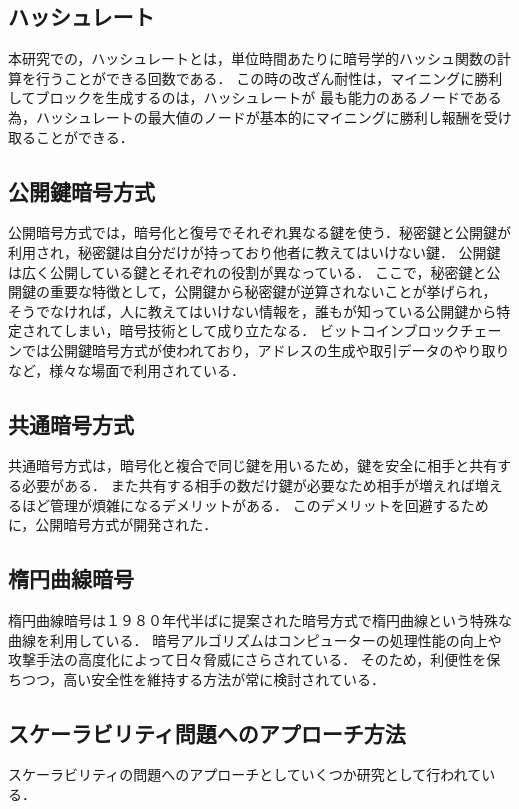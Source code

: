 \documentclass[a4paper,12pt]{jsarticle}
\begin{document}
      \subsection*{ハッシュレート}
本研究での，ハッシュレートとは，単位時間あたりに暗号学的ハッシュ関数の計算を行うことができる回数である．
この時の改ざん耐性は，マイニングに勝利してブロックを生成するのは，ハッシュレートが
最も能力のあるノードである為，ハッシュレートの最大値のノードが基本的にマイニングに勝利し報酬を受け取ることができる．

      \subsection*{公開鍵暗号方式}

公開暗号方式では，暗号化と復号でそれぞれ異なる鍵を使う．秘密鍵と公開鍵が利用され，秘密鍵は自分だけが持っており他者に教えてはいけない鍵．
公開鍵は広く公開している鍵とそれぞれの役割が異なっている．
ここで，秘密鍵と公開鍵の重要な特徴として，公開鍵から秘密鍵が逆算されないことが挙げられ，
そうでなければ，人に教えてはいけない情報を，誰もが知っている公開鍵から特定されてしまい，暗号技術として成り立たなる．
ビットコインブロックチェーンでは公開鍵暗号方式が使われており，アドレスの生成や取引データのやり取りなど，様々な場面で利用されている．

      \subsection*{共通暗号方式}
共通暗号方式は，暗号化と複合で同じ鍵を用いるため，鍵を安全に相手と共有する必要がある．
また共有する相手の数だけ鍵が必要なため相手が増えれば増えるほど管理が煩雑になるデメリットがある．
このデメリットを回避するために，公開暗号方式が開発された．

      \subsection*{楕円曲線暗号}
楕円曲線暗号は１９８０年代半ばに提案された暗号方式で楕円曲線という特殊な曲線を利用している．
暗号アルゴリズムはコンピューターの処理性能の向上や攻撃手法の高度化によって日々脅威にさらされている．
そのため，利便性を保ちつつ，高い安全性を維持する方法が常に検討されている．


\subsection{スケーラビリティ問題へのアプローチ方法}
スケーラビリティの問題へのアプローチとしていくつか研究として行われている．
\end{document}
